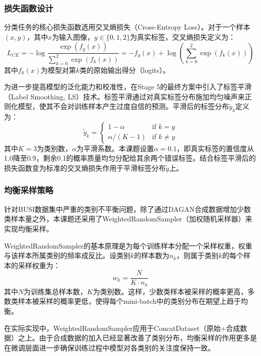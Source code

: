\subsubsection{损失函数设计}

分类任务的核心损失函数选用交叉熵损失（Cross-Entropy Loss）。对于一个样本$(x, y)$，其中$x$为输入图像，$y \in \{0, 1, 2\}$为真实标签，交叉熵损失定义为：
\begin{equation}
    \label{eq:ce}
    L_{CE} = -\log \frac{\exp(f_y(x))}{\sum_{k=0}^{2}\exp(f_k(x))} = -f_y(x) + \log\left(\sum_{k=0}^{2}\exp(f_k(x))\right)
\end{equation}
其中$f_k(x)$为模型对第$k$类的原始输出得分（logits）。

为进一步提高模型的泛化能力和校准性，在Stage 5的最终方案中引入了标签平滑（Label Smoothing, LS）技术\cite{szegedy2016rethinking}。标签平滑通过对真实标签分布施加均匀噪声来正则化模型，使其不会对训练样本产生过度自信的预测。平滑后的标签分布$\tilde{y}_k$定义为：
\begin{equation}
    \label{eq:label_smoothing}
    \tilde{y}_k = 
    \begin{cases}
        1 - \alpha & \text{if } k = y \\
        \alpha / (K - 1) & \text{if } k \neq y
    \end{cases}
\end{equation}
其中$K=3$为类别数，$\alpha$为平滑系数。本课题设置$\alpha = 0.1$，即真实标签的置信度从1.0降至0.9，剩余0.1的概率质量均匀分配给其余两个错误标签。结合标签平滑后的损失函数变为标准的交叉熵损失作用于平滑标签分布$\tilde{y}$上。

\subsubsection{均衡采样策略}

针对BUSI数据集中严重的类别不平衡问题，除了通过DAGAN合成数据增加少数类样本量之外，本课题还采用了WeightedRandomSampler（加权随机采样器）来实现均衡采样。

WeightedRandomSampler的基本原理是为每个训练样本分配一个采样权重，权重与该样本所属类别的频率成反比。设类别$k$的样本数为$n_k$，则属于类别$k$的每个样本的采样权重为：
\begin{equation}
    \label{eq:sampler}
    w_k = \frac{N}{K \cdot n_k}
\end{equation}
其中$N$为训练集总样本数，$K$为类别数。这样，少数类样本被采样的概率更高，多数类样本被采样的概率更低，使得每个mini-batch中的类别分布在期望上趋于均衡。

在实际实现中，WeightedRandomSampler应用于ConcatDataset（原始+合成数据）之上。由于合成数据的加入已经显著改善了类别分布，均衡采样的作用更多是在微调层面进一步确保训练过程中模型对各类别的关注度保持一致。

